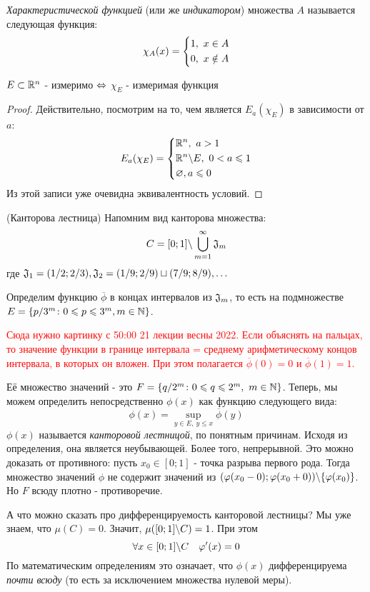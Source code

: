\begin{definition}
	\textit{Характеристической функцией} (или же \textit{индикатором}) множества $A$ называется следующая функция:
	\[
		\chi_A(x) = \left\{\begin{aligned}
			&{1,\ x \in A}
			\\
			&{0,\ x \notin A}
		\end{aligned}\right.
	\]
\end{definition}

\begin{proposition}
	$E \subset \mathbb{R}^n$ - измеримо $\Leftrightarrow$ $\chi_E$ - измеримая функция
\end{proposition}

\begin{proof}
	Действительно, посмотрим на то, чем является $E_a(\chi_E)$ в зависимости от $a$:
	\[
		E_a(\chi_E) = \left\{\begin{aligned}
			&{\mathbb{R}^n,\ a > 1}
			\\
			&{\mathbb{R}^n \backslash E,\ 0 < a \leqslant 1}
			\\
			&{\varnothing, a \leqslant 0}
		\end{aligned}\right.
	\]
	Из этой записи уже очевидна эквивалентность условий.
\end{proof}

\begin{example} (Канторова лестница)
	Напомним вид канторова множества:
	\[
		C = [0; 1] \backslash \bigcup_{m = 1}^\infty \mathfrak{J}_m
	\]
	где $\mathfrak{J}_1 = (1/2; 2/3), \mathfrak{J}_2 = (1/9; 2/9) \sqcup (7/9; 8/9), \ldots$
	
	Определим функцию $\overline{\phi}$ в концах интервалов из $\mathfrak{J}_m$, то есть на подмножестве $E = \{p/3^m \colon 0 \leqslant p \leqslant 3^m, m \in \mathbb{N}\}$.
	
	\textcolor{red}{Сюда нужно картинку с 50:00 21 лекции весны 2022. Если объяснять на пальцах, то значение функции в границе интервала = среднему арифметическому концов интервала, в которых он вложен. При этом полагается $\overline{\phi}(0) = 0$ и $\overline{\phi}(1) = 1$.}
	
	Её множество значений - это $F = \{q / 2^m \colon 0 \leqslant q \leqslant 2^m,\ m \in \mathbb{N}\}$. Теперь, мы можем определить непосредственно $\phi(x)$ как функцию следующего вида:
	\[
		\phi(x) = \sup_{y \in E,\ y \le x} \overline{\phi}(y)
	\]
	$\phi(x)$ называется \textit{канторовой лестницой}, по понятным причинам. Исходя из определения, она является неубывающей. Более того, непрерывной. Это можно доказать от противного: пусть $x_0 \in [0; 1]$ - точка разрыва первого рода. Тогда множество значений $\phi$ не содержит значений из $(\varphi(x_0 - 0); \varphi(x_0 + 0)) \backslash \{\varphi(x_0)\}$. Но $F$ всюду плотно - противоречие.
	
	А что можно сказать про дифференцируемость канторовой лестницы? Мы уже знаем, что $\mu(C) = 0$. Значит, $\mu([0; 1] \backslash C) = 1$. При этом
	\[
		\forall x \in [0; 1] \backslash C \quad \varphi'(x) = 0
	\]
	По математическим определениям это означает, что $\phi(x)$ дифференцируема \textit{почти всюду} (то есть за исключением множества нулевой меры).
\end{example}

